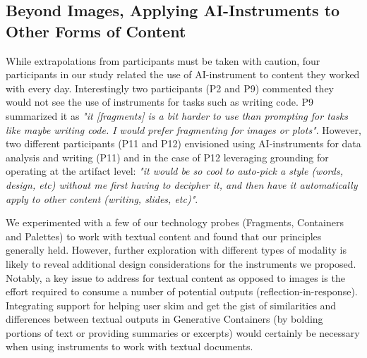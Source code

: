 

\subsection{Beyond Images, Applying AI-Instruments to Other Forms of Content}

While extrapolations from participants must be taken with caution, four participants in our study related the use of AI-instrument to content they worked with every day. Interestingly two participants (P2 and P9) commented they would not see the use of instruments for tasks such as writing code. P9 summarized it as \textit{"it [fragments] is a bit harder to use than prompting for tasks like maybe writing code. I would prefer fragmenting for images or plots"}.  However, two different participants (P11 and P12) envisioned using AI-instruments for data analysis and writing (P11) and in the case of P12 leveraging grounding for operating at the artifact level: \textit{"it would be so cool to auto-pick a style (words, design, etc) without me first having to decipher it, and then have it automatically apply to other content (writing, slides, etc)"}.


We experimented with a few of our technology probes (Fragments, Containers and Palettes) to work with textual content and found that our principles generally held. However, further exploration with different types of modality is likely to reveal additional design considerations for the instruments we proposed. Notably, a key issue to address for textual content as opposed to images is the effort required to consume a number of potential outputs (reflection-in-response). Integrating support for helping user skim and get the gist of similarities and differences between textual outputs in Generative Containers (by bolding portions of text or providing summaries or excerpts) would certainly be necessary when using instruments to work with textual documents.  

